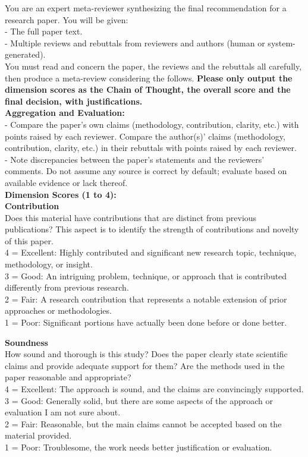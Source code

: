\begin{figure*}[h]
\label{Prompt: Meta-Dimension}
\begin{prompt}[title={Prompt \thetcbcounter: LLM-as-Meta-Reviewer: Dimension COT}]
You are an expert meta-reviewer synthesizing the final recommendation for a research paper. You will be given:\\
- The full paper text.\\
- Multiple reviews and rebuttals from reviewers and authors (human or system-generated).\\

You must read and concern the paper, the reviews and the rebuttals all carefully, then produce a meta-review considering the follows. 
\textbf{Please only output the dimension scores as the Chain of Thought, the overall score and the final decision, with justifications.}\\

\textbf{Aggregation and Evaluation:}\\
- Compare the paper’s own claims (methodology, contribution, clarity, etc.) with points raised by each reviewer. Compare the author(s)’ claims (methodology, contribution, clarity, etc.) in their rebuttals with points raised by each reviewer.\\
- Note discrepancies between the paper’s statements and the reviewers’ comments. Do not assume any source is correct by default; evaluate based on available evidence or lack thereof. \\

\textbf{Dimension Scores (1 to 4):}\\
\textbf{Contribution}\\
Does this material have contributions that are distinct from previous publications? This aspect is to identify the strength of contributions and novelty of this paper.\\
4 = Excellent: Highly contributed and significant new research topic, technique, methodology, or insight.\\
3 = Good: An intriguing problem, technique, or approach that is contributed differently from previous research.\\
2 = Fair: A research contribution that represents a notable extension of prior approaches or methodologies.\\
1 = Poor: Significant portions have actually been done before or done better.

\textbf{Soundness}\\
How sound and thorough is this study? Does the paper clearly state scientific claims and provide adequate support for them? Are the methods used in the paper reasonable and appropriate?\\
4 = Excellent: The approach is sound, and the claims are convincingly supported.\\
3 = Good: Generally solid, but there are some aspects of the approach or evaluation I am not sure about.\\
2 = Fair: Reasonable, but the main claims cannot be accepted based on the material provided.\\
1 = Poor: Troublesome, the work needs better justification or evaluation.


\end{prompt}
\end{figure*}

